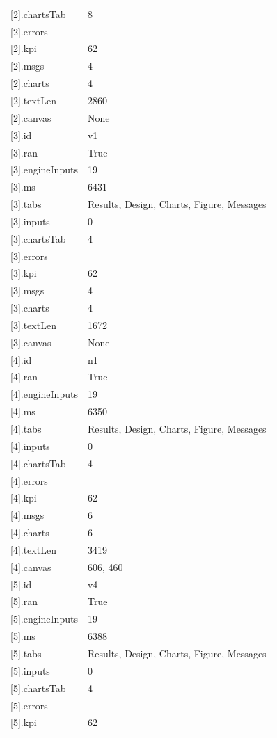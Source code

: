 {\begin{longtable}{p{}p{}}
{}[2].chartsTab & 8\\
{}[2].errors & \\
{}[2].kpi & 62\\
{}[2].msgs & 4\\
{}[2].charts & 4\\
{}[2].textLen & 2860\\
{}[2].canvas & None\\
{}[3].id & v1\\
{}[3].ran & True\\
{}[3].engineInputs & 19\\
{}[3].ms & 6431\\
{}[3].tabs & Results, Design, Charts, Figure, Messages\\
{}[3].inputs & 0\\
{}[3].chartsTab & 4\\
{}[3].errors & \\
{}[3].kpi & 62\\
{}[3].msgs & 4\\
{}[3].charts & 4\\
{}[3].textLen & 1672\\
{}[3].canvas & None\\
{}[4].id & n1\\
{}[4].ran & True\\
{}[4].engineInputs & 19\\
{}[4].ms & 6350\\
{}[4].tabs & Results, Design, Charts, Figure, Messages\\
{}[4].inputs & 0\\
{}[4].chartsTab & 4\\
{}[4].errors & \\
{}[4].kpi & 62\\
{}[4].msgs & 6\\
{}[4].charts & 6\\
{}[4].textLen & 3419\\
{}[4].canvas & 606, 460\\
{}[5].id & v4\\
{}[5].ran & True\\
{}[5].engineInputs & 19\\
{}[5].ms & 6388\\
{}[5].tabs & Results, Design, Charts, Figure, Messages\\
{}[5].inputs & 0\\
{}[5].chartsTab & 4\\
{}[5].errors & \\
{}[5].kpi & 62\\

\end{longtable}}

